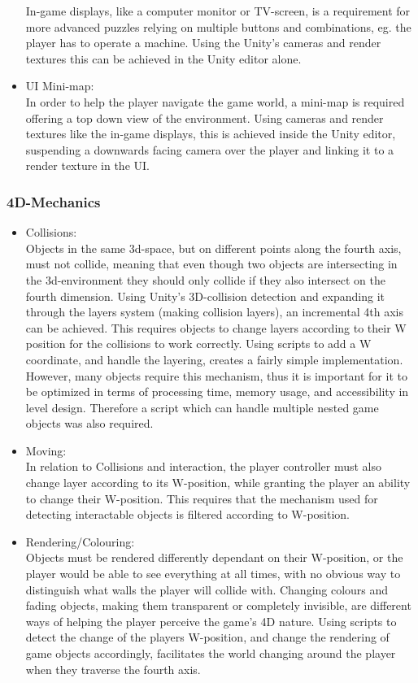 \begin{itemize}
	In-game displays, like a computer monitor or TV-screen, is a requirement for more advanced puzzles relying on multiple buttons and combinations, eg. the player has to operate a machine. Using the Unity's cameras and render textures this can be achieved in the Unity editor alone. 
	\item UI Mini-map:\\
	In order to help the player navigate the game world, a mini-map is required offering a top down view of the environment. Using cameras and render textures like the in-game displays, this is achieved inside the Unity editor, suspending a downwards facing camera over the player and linking it to a render texture in the UI.
\end{itemize}

\subsubsection{4D-Mechanics}
\begin{itemize}
	\item Collisions:\\
	Objects in the same 3d-space, but on different points along the fourth axis, must not collide, meaning that even though two objects are intersecting in the 3d-environment they should only collide if they also intersect on the fourth dimension. Using Unity's 3D-collision detection and expanding it through the layers system (making collision layers), an incremental 4th axis can be achieved. This requires objects to change layers according to their W position for the collisions to work correctly. Using scripts to add a W coordinate, and handle the layering, creates a fairly simple implementation. However, many objects require this mechanism, thus it is important for it to be optimized in terms of processing time, memory usage, and accessibility in level design. Therefore a script which can handle multiple nested game objects was also required. 
	\item Moving:\\
	In relation to Collisions and interaction, the player controller must also change layer according to its W-position, while granting the player an ability to change their W-position. This requires that the mechanism used for detecting interactable objects is filtered according to W-position.
	\item Rendering/Colouring:\\
	Objects must be rendered differently dependant on their W-position, or the player would be able to see everything at all times, with no obvious way to distinguish what walls the player will collide with. Changing colours and fading objects, making them transparent or completely invisible, are different ways of helping the player perceive the game's 4D nature. Using scripts to detect the change of the players W-position, and change the rendering of game objects accordingly, facilitates the world changing around the player when they traverse the fourth axis.
\end{itemize}